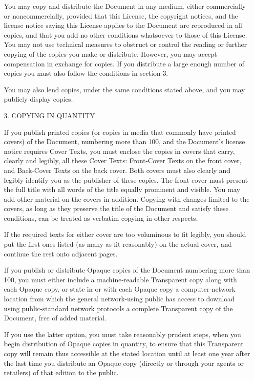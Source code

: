 \documentclass{article}
\begin{document}
You may copy and distribute the Document in any medium, either commercially or noncommercially, provided that this License, the copyright notices, and the license notice saying this License applies to the Document are reproduced in all copies, and that you add no other conditions whatsoever to those of this License.  You may not use technical measures to obstruct or control the reading or further copying of the copies you make or distribute. However, you may accept compensation in exchange for copies. If you distribute a large enough number of copies you must also follow the conditions in section 3. 

You may also lend copies, under the same conditions stated above, and you may publicly display copies. 

3. COPYING IN QUANTITY 

If you publish printed copies (or copies in media that commonly have printed covers) of the Document, numbering more than 100, and the Document's license notice requires Cover Texts, you must enclose the copies in covers that carry, clearly and legibly, all these Cover Texts: Front-Cover Texts on the front cover, and Back-Cover Texts on the back cover. Both covers must also clearly and legibly identify you as the publisher of these copies. The front cover must present the full title with all words of the title equally prominent and visible.  You may add other material on the covers in addition. Copying with changes limited to the covers, as long as they preserve the title of the Document and satisfy these conditions, can be treated as verbatim copying in other respects. 

If the required texts for either cover are too voluminous to fit legibly, you should put the first ones listed (as many as fit reasonably) on the actual cover, and continue the rest onto adjacent pages. 

If you publish or distribute Opaque copies of the Document numbering more than 100, you must either include a machine-readable Transparent copy along with each Opaque copy, or state in or with each Opaque copy a computer-network location from which the general network-using public has access to download using public-standard network protocols a complete Transparent copy of the Document, free of added material. 

If you use the latter option, you must take reasonably prudent steps, when you begin distribution of Opaque copies in quantity, to ensure that this Transparent copy will remain thus accessible at the stated location until at least one year after the last time you distribute an Opaque copy (directly or through your agents or retailers) of that edition to the public. 
\end{document}
